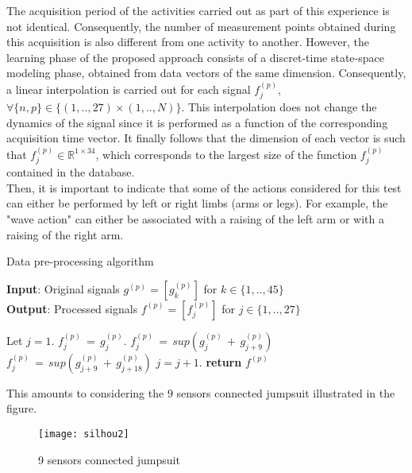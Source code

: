 \documentclass[letterpaper, 10 pt, conference]{ieeeconf}  %
\newcommand{\mR}{{\mathbb R}}
\begin{document}
The acquisition period of the activities carried out as part of this experience is not identical. Consequently, the number of measurement points obtained during this acquisition is also different from one activity to another. However, the learning phase of the proposed approach consists of a discret-time state-space modeling phase, obtained from data vectors of the same dimension. Consequently, a linear interpolation is carried out for each signal $f_j^{(p)}$, $\forall \{n,p \} \in \{(1,..,27) \times (1,..,N) \}$. This interpolation does not change the dynamics of the signal since it is performed as a function of the corresponding acquisition time vector. It finally follows that the dimension of each vector is such that $f_j^{(p)}\in \mR^{1 \times 34}$, which corresponds to the largest size of the function $f_j^{(p)}$ contained in the database.\\
Then, it is important to indicate that some of the actions considered for this test can either be performed by left or right limbs (arms or legs). For example, the "wave action" can either be associated with a raising of the left arm or with a raising of the right arm.


\begin{algorithm}[h]
\caption{Data pre-processing algorithm}
\label{alg:algorithm}
\textbf{Input}: Original signals $g^{(p)}=\left[ g_k^{(p)}\right]$ for $k\in \{1,..,45\}$\\
\textbf{Output}: Processed signals $f^{(p)}=\left[ f_j^{(p)}\right]$ for $j\in \{1,..,27\}$\\
\begin{algorithmic}[1] %
\STATE Let $j=1$.
\STATE $f_j^{(p)}\,=\,g_j^{(p)}$.
\STATE $f_j^{(p)}\,=\,sup(g_j^{(p)}\,+\,g_{j+9}^{(p)})$
\ELSE
\STATE $f_j^{(p)}\,=\,sup(g_{j+9}^{(p)}\,+\,g_{j+18}^{(p)})$
\ENDIF
\STATE $j=j+1$.
\ENDWHILE
\STATE \textbf{return} $f^{(p)}$
\end{algorithmic}
\end{algorithm}

This amounts to considering the $9$ sensors connected jumpsuit illustrated in the figure.

\begin{figure}[h]
	\begin{center}
		\texttt{[image: silhou2]}
		\caption{9 sensors connected jumpsuit} 
		\label{fig:silhou}
	\end{center}
\end{figure}
\end{document}
